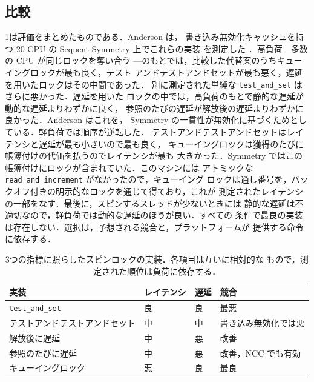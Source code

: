 \documentclass[../main.tex]{subfiles}
\begin{document}
\subsection{比較}

\cref{tab:l10-spin-compare}は評価をまとめたものである．Anderson は，
書き込み無効化キャッシュを持つ 20 CPU の Sequent Symmetry 上でこれらの実装
を測定した \cite{anderson1990}．高負荷---多数の CPU が同じロックを奪い合う
---のもとでは，比較した代替案のうちキューイングロックが最も良く，テスト
アンドテストアンドセットが最も悪く，遅延を用いたロックはその中間であった．
別に測定された単純な \texttt{test\_and\_set} はさらに悪かった．遅延を用いた
ロックの中では，高負荷のもとで静的な遅延が動的な遅延よりわずかに良く，
参照のたびの遅延が解放後の遅延よりわずかに良かった．Anderson はこれを，
Symmetry の一貫性が無効化に基づくためとしている．軽負荷では順序が逆転した．
テストアンドテストアンドセットはレイテンシと遅延が最も小さいので最も良く，
キューイングロックは獲得のたびに帳簿付けの代価を払うのでレイテンシが最も
大きかった．Symmetry ではこの帳簿付けにロックが含まれていた．このマシンには
アトミックな \texttt{read\_and\_increment} がなかったので，キューイング
ロックは通し番号を，バックオフ付きの明示的なロックを通じて得ており，これが
測定されたレイテンシの一部をなす．最後に，スピンするスレッドが少ないときには
静的な遅延は不適切なので，軽負荷では動的な遅延のほうが良い．すべての
条件で最良の実装は存在しない．選択は，予想される競合と，プラットフォームが
提供する命令に依存する．

\begin{table}[htbp]
  \centering
  \caption{3つの指標に照らしたスピンロックの実装．各項目は互いに相対的な
    もので，測定された順位は負荷に依存する．}
  \label{tab:l10-spin-compare}
  \small
  \begin{tabular}{@{}llll@{}}
    \toprule
    実装 & レイテンシ & 遅延 & 競合 \\
    \midrule
    \texttt{test\_and\_set}        & 良 & 良 & 最悪 \\
    テストアンドテストアンドセット & 中 & 中 & 書き込み無効化では悪 \\
    解放後に遅延                   & 中 & 悪 & 改善 \\
    参照のたびに遅延               & 中 & 悪 & 改善，NCC でも有効 \\
    キューイングロック             & 悪 & 良 & 最良 \\
    \bottomrule
  \end{tabular}
\end{table}
\end{document}
